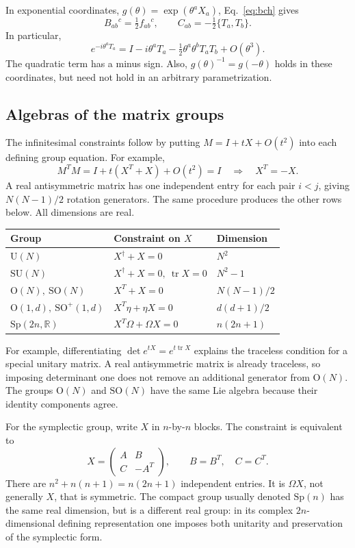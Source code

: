 \documentclass[11pt]{article}
\newcommand{\R}{\mathbb{R}}
\newcommand{\SO}{\mathrm{SO}}
\newcommand{\OO}{\mathrm{O}}
\newcommand{\SU}{\mathrm{SU}}
\newcommand{\UU}{\mathrm{U}}
\newcommand{\Sp}{\mathrm{Sp}}
\newcommand{\tr}{\operatorname{tr}}
\begin{document}
In exponential coordinates, \(g(\theta)=\exp(\theta^aX_a)\),
Eq.~\eqref{eq:bch} gives
\[
 B_{ab}{}^c=\tfrac12 f_{ab}{}^c,
 \qquad C_{ab}=-\tfrac12\{T_a,T_b\}.
\]
In particular,
\begin{equation}
 e^{-i\theta^aT_a}
 =I-i\theta^aT_a-\tfrac12\theta^a\theta^bT_aT_b+O(\theta^3).
 \label{eq:second-order}
\end{equation}
The quadratic term has a minus sign. Also,
\(g(\theta)^{-1}=g(-\theta)\) holds in these coordinates, but need not
hold in an arbitrary parametrization.

\subsection{Algebras of the matrix groups}
The infinitesimal constraints follow by putting \(M=I+tX+O(t^2)\)
into each defining group equation. For example,
\[
 M^TM=I+t(X^T+X)+O(t^2)=I
 \quad\Longrightarrow\quad X^T=-X.
\]
A real antisymmetric matrix has one independent entry for each pair
\(i<j\), giving \(N(N-1)/2\) rotation generators. The same procedure
produces the other rows below. All dimensions are real.
\begin{center}
\small
\begin{tabular}{@{}lll@{}}
\toprule
Group & Constraint on \(X\) & Dimension \\
\midrule
\(\UU(N)\) & \(X^\dagger+X=0\) & \(N^2\) \\
\(\SU(N)\) & \(X^\dagger+X=0,\ \tr X=0\) & \(N^2-1\) \\
\(\OO(N),\ \SO(N)\) & \(X^T+X=0\) & \(N(N-1)/2\) \\
\(\OO(1,d),\ \SO^+(1,d)\) & \(X^T\eta+\eta X=0\) & \(d(d+1)/2\) \\
\(\Sp(2n,\R)\) & \(X^T\Omega+\Omega X=0\) & \(n(2n+1)\) \\
\bottomrule
\end{tabular}
\end{center}
For example, differentiating \(\det e^{tX}=e^{t\tr X}\) explains the
traceless condition for a special unitary matrix. A real antisymmetric
matrix is already traceless, so imposing determinant one does not
remove an additional generator from \(\OO(N)\). The groups
\(\OO(N)\) and \(\SO(N)\) have the same Lie algebra because their
identity components agree.

For the symplectic group, write \(X\) in \(n\)-by-\(n\) blocks.
The constraint is equivalent to
\begin{equation}
 X=\begin{pmatrix}A&B\\ C&-A^T\end{pmatrix},
 \qquad B=B^T,\quad C=C^T.
 \label{eq:symplectic-algebra}
\end{equation}
There are \(n^2+n(n+1)=n(2n+1)\) independent entries.
It is \(\Omega X\), not generally \(X\), that is symmetric.
The compact group usually denoted \(\Sp(n)\) has the same real dimension,
but is a different real group: in its complex \(2n\)-dimensional defining
representation one imposes both unitarity and preservation of the
symplectic form.
\end{document}
